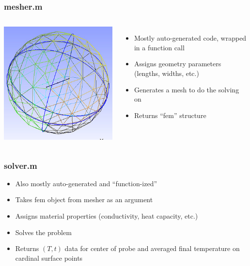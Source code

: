 \documentclass{beamer}
\begin{document}
\begin{frame}
\frametitle{mesher.m}
\begin{columns}[c]
    \includegraphics[width=\textwidth]{fig/example_mesh.png}
\begin{itemize}
    \item Mostly auto-generated code, wrapped in a function call
    \item Assigns geometry parameters (lengths, widths, etc.)
    \item Generates a mesh to do the solving on
    \item Returns ``fem'' structure
    \end{itemize}
\end{columns}
\end{frame}


\begin{frame}
\frametitle{solver.m}
\begin{itemize}
\item Also mostly auto-generated and ``function-ized''
\item Takes fem object from mesher as an argument
\item Assigns material properties (conductivity, heat capacity, etc.)
\item Solves the problem
\item Returns \((T,t)\) data for center of probe and averaged final temperature on 
cardinal surface points
\end{itemize}
\end{frame}
\end{document}
